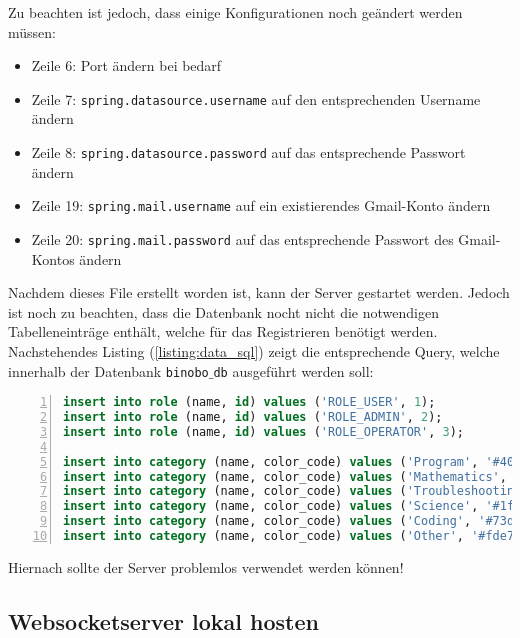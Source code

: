 \documentclass[paper=a4,12pt]{scrreprt}
\begin{document}
Zu beachten ist jedoch, dass einige Konfigurationen noch geändert werden müssen:\newline

\begin{itemize}
  \item Zeile 6: Port ändern bei bedarf
  \item Zeile 7: \texttt{spring.datasource.username} auf den entsprechenden Username ändern
  \item Zeile 8: \texttt{spring.datasource.password} auf das entsprechende Passwort ändern
  \item Zeile 19: \texttt{spring.mail.username} auf ein existierendes Gmail-Konto ändern
  \item Zeile 20: \texttt{spring.mail.password} auf das entsprechende Passwort des Gmail-Kontos ändern
\end{itemize}

Nachdem dieses File erstellt worden ist, kann der Server gestartet werden. Jedoch ist noch zu beachten, dass die Datenbank nocht nicht die notwendigen Tabelleneinträge enthält, welche für das Registrieren benötigt werden. Nachstehendes Listing (\ref{listing:data_sql}) zeigt die entsprechende Query, welche innerhalb der Datenbank \texttt{binobo$\_$db} ausgeführt werden soll:\newline

\begin{lstlisting}[caption={data.sql - Initiale Datenbankeinträge}, captionpos=b, label={listing:data_sql}, language=sql, numbers=left, stepnumber=1]
insert into role (name, id) values ('ROLE_USER', 1);
insert into role (name, id) values ('ROLE_ADMIN', 2);
insert into role (name, id) values ('ROLE_OPERATOR', 3);

insert into category (name, color_code) values ('Program', '#403891');
insert into category (name, color_code) values ('Mathematics', '#39568c');
insert into category (name, color_code) values ('Troubleshooting', '#ff4c4c');
insert into category (name, color_code) values ('Science', '#1f968b');
insert into category (name, color_code) values ('Coding', '#73d055');
insert into category (name, color_code) values ('Other', '#fde725');
\end{lstlisting}

Hiernach sollte der Server problemlos verwendet werden können!\newline

\subsection{Websocketserver lokal hosten}
\end{document}
